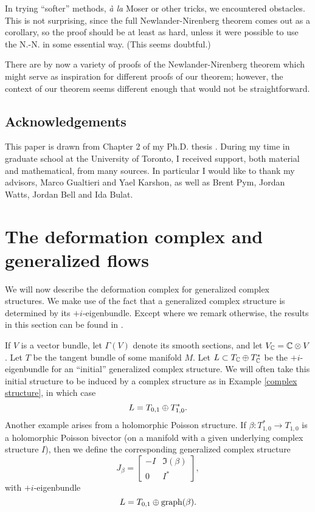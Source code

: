 \documentclass{article}
\begin{document}
In trying ``softer'' methods, \emph{\`a la} Moser or other tricks, we encountered obstacles.  This is not surprising, since the full Newlander-Nirenberg theorem comes out as a corollary, so the proof should be at least as hard, unless it were possible to use the N.-N. in some essential way.  (This seems doubtful.)

There are by now a variety of proofs of the Newlander-Nirenberg theorem which might serve as inspiration for different proofs of our theorem; however, the context of our theorem seems different enough that would not be straightforward.


\subsection{Acknowledgements}

This paper is drawn from Chapter 2 of my Ph.D. thesis \cite{Bailey}.  During my time in graduate school at the University of Toronto, I received support, both material and mathematical, from many sources.  In particular I would like to thank my advisors, Marco Gualtieri and Yael Karshon, as well as Brent Pym, Jordan Watts, Jordan Bell and Ida Bulat.



\section{The deformation complex and generalized flows}\label{deformation section}
We will now describe the deformation complex for generalized complex structures.  We make use of the fact that a generalized complex structure is determined by its $+i$-eigenbundle.  Except where we remark otherwise, the results in this section can be found in \cite[Section 5]{Gualtieri2011}.

If $V$ is a vector bundle, let $\Gamma(V)$ denote its smooth sections, and let $V_\mathbb C = \mathbb C \otimes V$.  Let $T$ be the tangent bundle of some manifold $M$.  Let $L \subset T_\mathbb C \oplus T_\mathbb C^*$ be the $+i$-eigenbundle for an ``initial'' generalized complex structure.  We will often take this initial structure to be induced by a complex structure as in Example \ref{complex structure}, in which case
$$L = T_{0,1} \oplus T^*_{1,0}.$$
Another example arises from a holomorphic Poisson structure.  If ${\beta : T^*_{1,0} \to T_{1,0}}$ is a holomorphic Poisson bivector (on a manifold with a given underlying complex structure $I$), then we define the corresponding generalized complex structure
$$J_\beta = 
\left[\begin{array}{cc}
-I & \Im(\beta) \\
0 & I^*
\end{array}\right],$$
with $+i$-eigenbundle
\begin{equation}\label{L for holomorphic bivector}
L = T_{0,1} \dsum \textnormal{graph}(\beta).
\end{equation}
\end{document}
